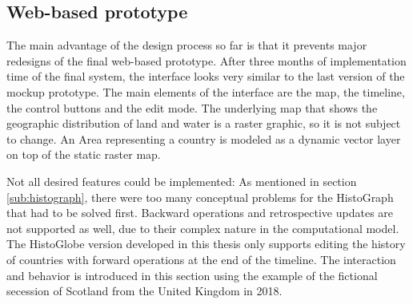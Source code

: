 
\subsection{Web-based prototype} %
\label{sub:web_based_prototype}

The main advantage of the design process so far is that it prevents major redesigns of the final web-based prototype. After three months of implementation time of the final system, the interface looks very similar to the last version of the mockup prototype. The main elements of the interface are the map, the timeline, the control buttons and the edit mode. The underlying map that shows the geographic distribution of land and water is a raster graphic, so it is not subject to change. An Area representing a country is modeled as a dynamic vector layer on top of the static raster map.

Not all desired features could be implemented:
As mentioned in section \ref{sub:histograph}, there were too many conceptual problems for the HistoGraph that had to be solved first.
Backward operations and retrospective updates are not supported as well, due to their complex nature in the computational model. The HistoGlobe version developed in this thesis only supports editing the history of countries with forward operations at the end of the timeline. The interaction and behavior is introduced in this section using the example of the fictional secession of Scotland from the United Kingdom in 2018.

\newpage

